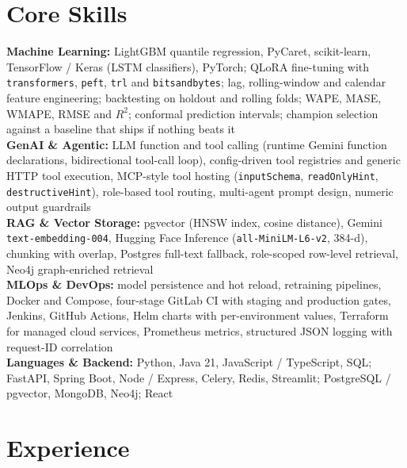 \documentclass[10pt,a4paper]{article}
\begin{document}
\section{Core Skills}
\textbf{Machine Learning:} LightGBM quantile regression, PyCaret, scikit-learn, TensorFlow / Keras
(LSTM classifiers), PyTorch; QLoRA fine-tuning with \texttt{transformers}, \texttt{peft},
\texttt{trl} and \texttt{bitsandbytes}; lag, rolling-window and calendar feature engineering;
backtesting on holdout and rolling folds; WAPE, MASE, WMAPE, RMSE and $R^2$; conformal prediction
intervals; champion selection against a baseline that ships if nothing beats it\\
\textbf{GenAI \& Agentic:} LLM function and tool calling (runtime Gemini function declarations,
bidirectional tool-call loop), config-driven tool registries and generic HTTP tool execution,
MCP-style tool hosting (\texttt{inputSchema}, \texttt{readOnlyHint}, \texttt{destructiveHint}),
role-based tool routing, multi-agent prompt design, numeric output guardrails\\
\textbf{RAG \& Vector Storage:} pgvector (HNSW index, cosine distance), Gemini
\texttt{text-embedding-004}, Hugging Face Inference (\texttt{all-MiniLM-L6-v2}, 384-d), chunking with
overlap, Postgres full-text fallback, role-scoped row-level retrieval, Neo4j graph-enriched retrieval\\
\textbf{MLOps \& DevOps:} model persistence and hot reload, retraining pipelines, Docker and Compose,
four-stage GitLab CI with staging and production gates, Jenkins, GitHub Actions, Helm charts with
per-environment values, Terraform for managed cloud services, Prometheus metrics, structured JSON
logging with request-ID correlation\\
\textbf{Languages \& Backend:} Python, Java 21, JavaScript / TypeScript, SQL; FastAPI, Spring Boot,
Node / Express, Celery, Redis, Streamlit; PostgreSQL / pgvector, MongoDB, Neo4j; React

\section{Experience}
\end{document}
